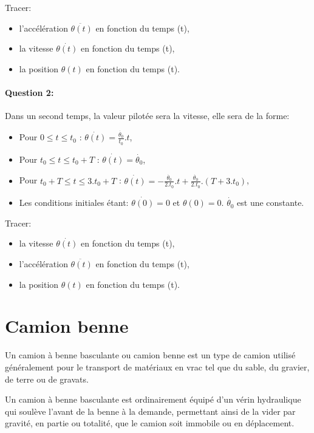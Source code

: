 Tracer:
\begin{itemize}
 \item l'accélération $\ddot{\theta(t)}$ en fonction du temps (t),
 \item la vitesse $\dot{\theta(t)}$ en fonction du temps (t),
 \item la position $\theta(t)$ en fonction du temps (t).
\end{itemize}

\newpage

\paragraph{Question 2:} Dans un second temps, la valeur pilotée sera la vitesse, elle sera de la forme:

\begin{itemize}
 \item Pour $0 \le t \le t_0$ : $\dot{\theta(t)}=\frac{\dot{\theta_0}}{t_0}.t$,
 \item Pour $t_0 \le t \le t_0+T$ : $\dot{\theta(t)}=\dot{\theta_0}$,
 \item Pour $t_0+T \le t \le 3.t_0+T$ : $\dot{\theta(t)}=-\frac{\dot{\theta_0}}{2.t_0}.t+\frac{\dot{\theta_0}}{2.t_0}.(T+3.t_0)$,
 \item Les conditions initiales étant: $\dot{\theta(0)}=0$ et $\theta(0)=0$. $\dot{\theta_0}$ est une constante.
\end{itemize}

Tracer:
\begin{itemize}
 \item la vitesse $\dot{\theta(t)}$ en fonction du temps (t),
 \item l'accélération $\ddot{\theta(t)}$ en fonction du temps (t),
 \item la position $\theta(t)$ en fonction du temps (t).
\end{itemize}

\newpage

\section{Camion benne}

Un camion à benne basculante ou camion benne est un type de camion utilisé généralement pour le transport de matériaux en vrac tel que du sable, du gravier, de terre ou de gravats.

Un camion à benne basculante est ordinairement équipé d'un vérin hydraulique qui soulève l'avant de la benne à la demande, permettant ainsi de la vider par gravité, en partie ou totalité, que le camion soit immobile ou en déplacement.

